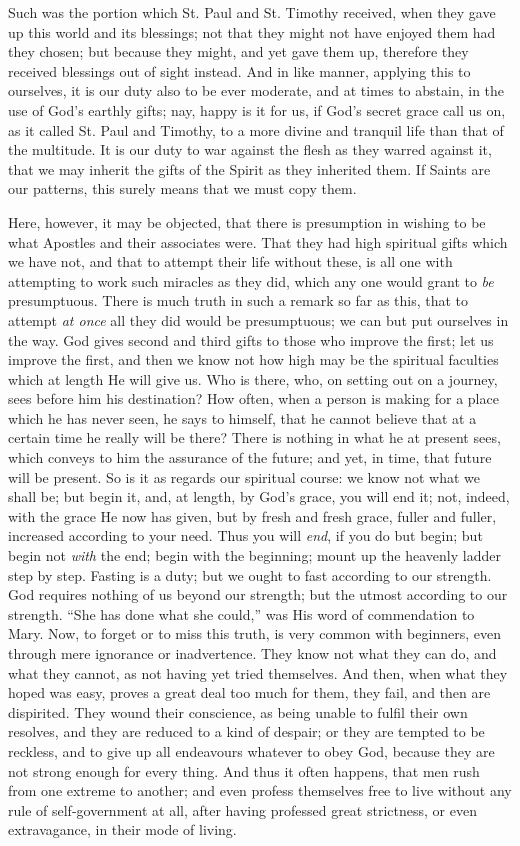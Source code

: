 Such was the portion which St. Paul and St. Timothy received, when
they gave up this world and its blessings; not that they might not have
enjoyed them had they chosen; but because they might, and yet gave them
up, therefore they received blessings out of sight instead. And in like
manner, applying this to ourselves, it is our duty also to be ever
moderate, and at times to abstain, in the use of God's earthly gifts;
nay, happy is it for us, if God's secret grace call us on, as it called
St. Paul and Timothy, to a more divine and tranquil life than that of
the multitude. It is our duty to war against the flesh as they warred
against it, that we may inherit the gifts of the Spirit as they
inherited them. If Saints are our patterns, this surely means that we
must copy them.

Here, however, it may be objected, that there is presumption in
wishing to be what Apostles and their associates were. That they had
high spiritual gifts which we have not, and that to attempt their life
without these, is all one with attempting to work such miracles as they
did, which any one would grant to \emph{be} presumptuous. There is much
truth in such a remark so far as this, that to attempt \emph{at once}
all they did would be presumptuous; we can but put ourselves in the
way. God gives second and third gifts to those who improve the first;
let us improve the first, and then we know not how high may be the
spiritual faculties which at length He will give us. Who is there, who,
on setting out on a journey, sees before him his destination? How often,
when a person is making for a place which he has never seen, he says to
himself, that he cannot believe that at a certain time he really will be
there? There is nothing in what he at present sees, which conveys to him
the assurance of the future; and yet, in time, that future will be
present. So is it as regards our spiritual course: we know not what we
shall be; but begin it, and, at length, by God's grace, you will end it;
not, indeed, with the grace He now has given, but by fresh and fresh
grace, fuller and fuller, increased according to your need. Thus you
will \emph{end}, if you do but begin; but begin not \emph{with} the end;
begin with the beginning; mount up the heavenly ladder step by step.
Fasting is a duty; but we ought to fast according to our strength. God
requires nothing of us beyond our strength; but the utmost according to
our strength. ``She has done what she could,'' was His word of
commendation to Mary. Now, to forget or to miss this truth, is very
common with beginners, even through mere ignorance or inadvertence. They
know not what they can do, and what they cannot, as not having yet tried
themselves. And then, when what they hoped was easy, proves a great deal
too much for them, they fail, and then are dispirited. They wound their
conscience, as being unable to fulfil their own resolves, and they are
reduced to a kind of despair; or they are tempted to be reckless, and to
give up all endeavours whatever to obey God, because they are not strong
enough for every thing. And thus it often happens, that men rush from
one extreme to another; and even profess themselves free to live without
any rule of self-government at all, after having professed great
strictness, or even extravagance, in their mode of living.

